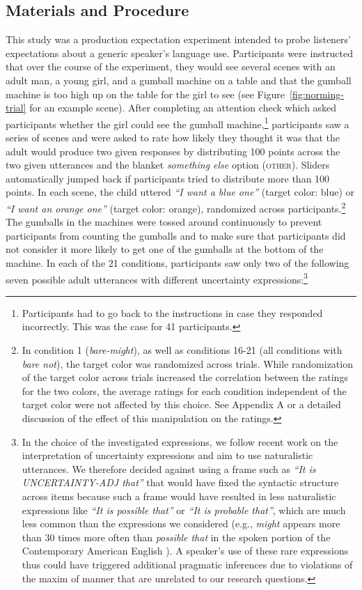\documentclass[man, floatsintext]{apa6}
\begin{document}
\subsection{Materials and Procedure}
This study was a production expectation experiment intended to probe listeners' expectations about a generic speaker's language use.
Participants were instructed that over the course of the experiment, they would see several scenes with an adult man, 
a young girl, and a gumball machine on a table and 
that the gumball machine is too high up on the table for the girl to see (see Figure~\ref{fig:norming-trial} for an example scene). 
After completing an attention check which asked participants whether 
the girl could see the gumball machine,\footnote{Participants had to go back to the instructions in case they responded incorrectly. This was the case for 41 participants.} 
participants saw a series of scenes  and were asked to rate how likely they thought it was that the 
adult would produce two given responses by distributing 100 points across the two given utterances and the 
blanket \textit{something else} option (\textsc{other}). Sliders automatically jumped back if participants tried to distribute more than 100 points. 
In each scene, the child uttered \textit{``I want a blue one''} (target color: blue) or  \textit{``I want an orange one''} (target color: orange), randomized across participants.\footnote{In condition 1 (\textit{bare-might}), as well as conditions 16-21 (all conditions with \textit{bare not}), the target color was randomized across trials. While randomization of the target color across trials increased the correlation between the ratings for the two colors,  the average ratings for each condition independent of the target color were not affected by this choice. See Appendix A or a detailed discussion of the effect of this manipulation on the ratings.} The gumballs in the machines were tossed around continuously to prevent participants from counting the gumballs
and to make sure that participants did not consider it more likely to get one of the gumballs at the bottom of the machine.
 In each of the 21 conditions, participants saw only  two of the following seven possible adult utterances with different uncertainty expressions:\footnote{In the choice of the investigated expressions, we follow recent work on the interpretation of uncertainty expressions \parencite{Pogue2018} and aim to use naturalistic utterances. We therefore decided against using a frame such as \emph{``It is UNCERTAINTY-ADJ that''} that would have fixed the syntactic structure across items because such a frame would have resulted in less naturalistic expressions like  \emph{``It is possible that''} or  \emph{``It is probable that''}, which are much less common than the expressions we considered (e.g., \textit{might} appears more than 30 times more often than \textit{possible that} in the spoken portion of the Contemporary American English \parencite{Davies2009}). A speaker's use of these rare expressions thus could have triggered additional pragmatic inferences due to violations of the maxim of manner \parencite{Grice1975} that are unrelated to our research questions.}
\end{document}
